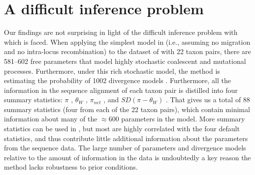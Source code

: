 \section{A difficult inference problem}
Our findings are not surprising in light of the difficult inference problem
with which \msb is faced.
When applying the simplest model in \msb (i.e., assuming no migration and no
intra-locus recombination) to the dataset of \citet{Oaks2012} with 22 taxon
pairs, there are 581--602 free parameters that model highly stochastic
coalescent and mutational processes.
Furthermore, under this rich stochastic model, the method is estimating the
probability of 1002 divergence models \citep[i.e., the number of integer
partitions of $Y=22$;][]{Oaks2012}.
Furthermore, all the information in the sequence alignment of each taxon pair
is distilled into four summary statistics:
$\pi$ \citep{Tajima1983}, $\theta_W$ \citep{Watterson1975}, $\pi_{net}$
\citep{Takahata1985}, and $SD(\pi-\theta_W)$ \citep{Tajima1989}.
That gives us a total of 88 summary statistics (four from each of the 22 taxon
pairs), which contain minimal information about many of the $\approx 600$
parameters in the model.
More summary statistics can be used in \msb, but most are highly correlated
with the four default statistics, and thus contribute little additional
information about the parameters from the sequence data.
The large number of parameters and divergence models relative to the amount of
information in the data is undoubtedly a key reason the method lacks robustness
to prior conditions.

